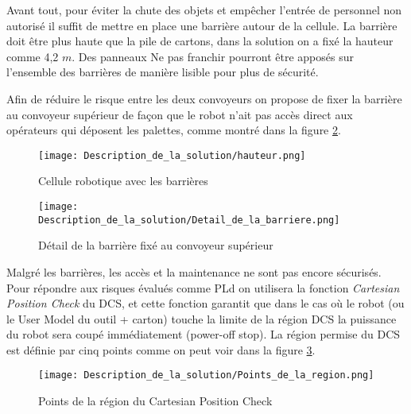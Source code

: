 Avant tout, pour éviter la chute des objets et empêcher l’entrée de personnel non autorisé il suffit de mettre en place une barrière autour de la cellule. La barrière doit être plus haute que la pile de cartons, dans la solution on a fixé la hauteur comme 4,2 $ m $.
Des panneaux  \flqq Ne pas franchir\frqq{}  pourront être apposés sur l’ensemble des barrières de manière lisible pour plus de sécurité.
\par
Afin de réduire le risque entre les deux convoyeurs on propose de fixer la barrière au convoyeur supérieur de façon que le robot n’ait pas accès direct aux opérateurs qui déposent les palettes, comme montré dans la figure \ref{fig:Detail_de_la_barriere}.

\pagebreak
\begin{figure}[H]
	\begin{center}	
		\texttt{[image: Description\_de\_la\_solution/hauteur.png]}
		\caption{Cellule robotique avec les barrières}
		\label{fig:hauteur}
	\end{center}
\end{figure}



\begin{figure}[H]
	\begin{center}	
		\texttt{[image: Description\_de\_la\_solution/Detail\_de\_la\_barriere.png]}
		\caption{Détail de la barrière fixé au convoyeur supérieur}
		\label{fig:Detail_de_la_barriere}
	\end{center}
\end{figure}	
\pagebreak
Malgré les barrières, les accès et la maintenance ne sont pas encore sécurisés. Pour répondre aux risques évalués comme PLd on utilisera la fonction \textit{Cartesian Position Check}  du DCS, et cette fonction garantit que dans le cas où le robot (ou le User Model du outil + carton) touche la limite de la région DCS la puissance du robot sera coupé immédiatement (power-off stop). La région permise du DCS est définie par cinq points comme on peut voir dans la figure \ref{fig:Points_de_la_region}. 


\begin{figure}[H]
	\begin{center}	
		\texttt{[image: Description\_de\_la\_solution/Points\_de\_la\_region.png]}
		\caption{Points de la région du Cartesian Position Check}
		\label{fig:Points_de_la_region}
	\end{center}
\end{figure}


